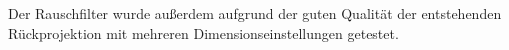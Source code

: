 \documentclass[slug=PET, room=Andreas-Schubert-Bau\,\ 424A,
supervisor=Carsten\ Bittrich, coursedate=10.\ 01.\ 2020, ngerman]{../../Lab_Report_LaTeX/lab_report}
\begin{document}

Der Rauschfilter wurde außerdem aufgrund der guten Qualit\"at der
entstehenden R\"uckprojektion mit mehreren Dimensionseinstellungen getestet.
\end{document}
